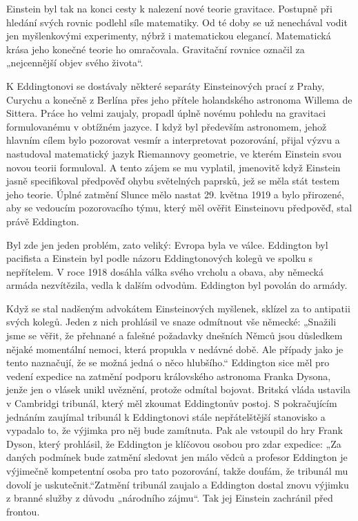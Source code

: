   Einstein byl tak na konci cesty k nalezení nové teorie gravitace. Postupně při hledání svých
  rovnic podlehl síle matematiky. Od té doby se už nenechával vodit jen myšlenkovými experimenty,
  nýbrž i matematickou elegancí. Matematická krása jeho konečné teorie ho omračovala. Gravitační
  rovnice označil za „nejcennější objev svého života“. 
  
  K Eddingtonovi se dostávaly některé separáty Einsteinových prací z Prahy, Curychu a konečně z
  Berlína přes jeho přítele holandského astronoma Willema de Sittera. Práce ho velmi zaujaly,
  propadl úplně novému pohledu na gravitaci formulovanému v obtížném jazyce. I když byl především
  astronomem, jehož hlavním cílem bylo pozorovat vesmír a interpretovat pozorování, přijal výzvu a
  nastudoval matematický jazyk Riemannovy geometrie, ve kterém Einstein svou novou teorii
  formuloval. A tento zájem se mu vyplatil, jmenovitě když Einstein jasně specifikoval předpověď
  ohybu světelných paprsků, jež se měla stát testem jeho teorie. Úplné zatmění Slunce mělo nastat
  29. května 1919 a bylo přirozené, aby se vedoucím pozorovacího týmu, který měl ověřit Einsteinovu
  předpověď, stal právě Eddington. 
  
  Byl zde jen jeden problém, zato veliký: Evropa byla ve válce. Eddington byl pacifista a Einstein
  byl podle názoru Eddingtonových kolegů ve spolku s nepřítelem. V roce 1918 dosáhla válka svého
  vrcholu a obava, aby německá armáda nezvítězila, vedla k dalším odvodům. Eddington byl povolán do
  armády. 
  
  Když se stal nadšeným advokátem Einsteinových myšlenek, sklízel za to antipatii svých kolegů.
  Jeden z nich prohlásil ve snaze odmítnout vše německé: „Snažili jsme se věřit, že přehnané a
  falešné požadavky dnešních Němců jsou důsledkem nějaké momentální nemoci, která propukla v nedávné
  době. Ale případy jako je tento naznačují, že se možná jedná o něco hlubšího.“ Eddington sice měl
  pro vedení expedice na zatmění podporu královského astronoma Franka Dysona, jenže jen o vlásek
  unikl uvěznění, protože odmítal bojovat. Britská vláda ustavila v Cambridgi tribunál, který měl
  zkoumat Eddingtonův postoj. S pokračujícím jednáním zaujímal tribunál k Eddingtonovi stále
  nepřátelštější stanovisko a vypadalo to, že výjimka pro něj bude zamítnuta. Pak ale vstoupil do
  hry Frank Dyson, který prohlásil, že Eddington je klíčovou osobou pro zdar expedice: „Za daných
  podmínek bude zatmění sledovat jen málo vědců a profesor Eddington je výjimečně kompetentní osoba
  pro tato pozorování, takže doufám, že tribunál mu dovolí je uskutečnit.“Zatmění tribunál zaujalo a
  Eddington dostal znovu výjimku z branné služby z důvodu „národního zájmu“. Tak jej Einstein
  zachránil před frontou. 
  
